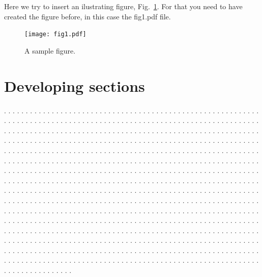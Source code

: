 \documentclass[twocolumn]{revtex4}
\begin{document}
Here we try to insert an ilustrating figure, Fig.~\ref{fig:sample}.
For that you need to have created the figure before, in this case
the fig1.pdf file.

\begin{figure}[h!]
\centering
\texttt{[image: fig1.pdf]}
\caption{A sample figure.}
\label{fig:sample}
\end{figure}

\section{Developing sections}
. . . . . . . . . . . . . . . . . . . . . . . . . . . . . . . . . . . . . . . .
. . . . . . . . . . . . . . . . . . . . . . . . . . . . . . . . . . . . . . . .
. . . . . . . . . . . . . . . . . . . . . . . . . . . . . . . . . . . . . . . .
. . . . . . . . . . . . . . . . . . . . . . . . . . . . . . . . . . . . . . . .
. . . . . . . . . . . . . . . . . . . . . . . . . . . . . . . . . . . . . . . .
. . . . . . . . . . . . . . . . . . . . . . . . . . . . . . . . . . . . . . . .
. . . . . . . . . . . . . . . . . . . . . . . . . . . . . . . . . . . . . . . .
. . . . . . . . . . . . . . . . . . . . . . . . . . . . . . . . . . . . . . . .
. . . . . . . . . . . . . . . . . . . . . . . . . . . . . . . . . . . . . . . .
. . . . . . . . . . . . . . . . . . . . . . . . . . . . . . . . . . . . . . . .
. . . . . . . . . . . . . . . . . . . . . . . . . . . . . . . . . . . . . . . .
. . . . . . . . . . . . . . . . . . . . . . . . . . . . . . . . . . . . . . . .
. . . . . . . . . . . . . . . . . . . . . . . . . . . . . . . . . . . . . . . .
. . . . . . . . . . . . . . . . . . . . . . . . . . . . . . . . . . . . . . . .
. . . . . . . . . . . . . . . . . . . . . . . . . . . . . . . . . . . . . . . .
. . . . . . . . . . . . . . . . . . . . . . . . . . . . . . . . . . . . . . . .
. . . . . . . . . . . . . . . . . . . . . . . . . . . . . . . . . . . . . . . .
. . . . . . . . . . . . . . . . . . . . . . . . . . . . . . . . . . . . . . . .
. . . . . . . . . . . . . . . . . . . . . . . . . . . . . . . . . . . . . . . .
. . . . . . . . . . . . . . . . . . . . . . . . . . . . . . . . . . . . . . . .
. . . . . . . . . . . . . . . . . . . . . . . . . . . . . . . . . . . . . . . .
. . . . . . . . . . . . . . . . . . . . . . . . . . . . . . . . . . . . . . . .
. . . . . . . . . . . . . . . . . . . . . . . . . . . . . . . . . . . . . . . .
. . . . . . . . . . . . . . . . . . . . . . . . . . . . . . . . . . . . . . . .
\end{document}
